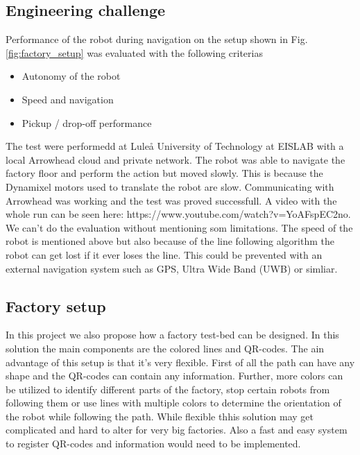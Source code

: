 \subsection{Engineering challenge}
Performance of the robot during navigation on the setup shown in Fig. \ref{fig:factory_setup} was evaluated with the following criterias

\begin{itemize}
    \item Autonomy of the robot
    \item Speed and navigation
    \item Pickup / drop-off performance
\end{itemize}

The test were performedd at Luleå University of Technology at EISLAB with a local Arrowhead cloud and private network. The robot was able to navigate the factory floor and perform the action but moved slowly. This is because the Dynamixel motors used to translate the robot are slow. Communicating with Arrowhead was working and the test was proved successfull. A video with the whole run can be seen here: https://www.youtube.com/watch?v=YoAFspEC2no. 
We can't do the evaluation without mentioning som limitations. The speed of the robot is mentioned above but also because of the line following algorithm the robot can get lost if it ever loses the line. This could be prevented with an external navigation system such as GPS, Ultra Wide Band (UWB) or simliar. 

\subsection{Factory setup}
In this project we also propose how a factory test-bed can be designed. In this solution the main components are the colored lines and QR-codes. The ain advantage of this setup is that it's very flexible. First of all the path can have any shape and the QR-codes can contain any information. Further, more colors can be utilized to identify different parts of the factory, stop certain robots from following them or use lines with multiple colors to determine the orientation of the robot while following the path. While flexible thhis solution may get complicated and hard to alter for very big factories. Also a fast and easy system to register QR-codes and information would need to be implemented. 